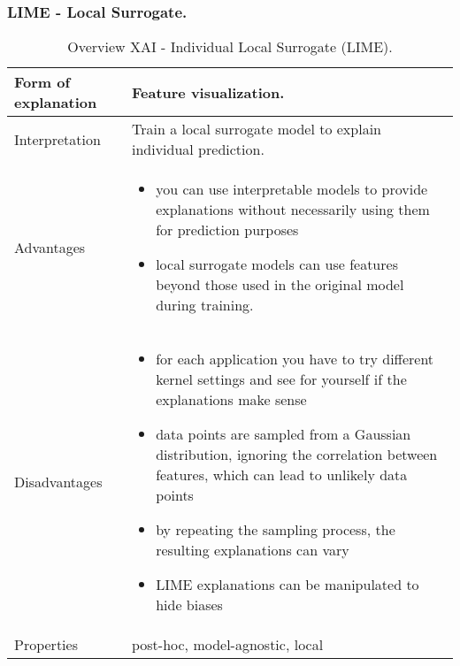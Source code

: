 \subsubsection{LIME - Local Surrogate.}
\begin{table}[H]
  \centering
  \begin{tabular}{|p{}|p{}|}
    \hline
    Form of \newline explanation & 
    Feature visualization. \\
    
    \hline
    Interpretation & 
    Train a local surrogate model to explain individual prediction.\\
    \hline
    Advantages &
    \begin{itemize}[nosep, left=0em]
        \item you can use interpretable models to provide explanations without necessarily using them for prediction purposes
        \item local surrogate models can use features beyond those used in the original model during training.
    \end{itemize} \\
    
    \hline
    Disadvantages &
    \begin{itemize}[nosep, left=0em]
        \item for each application you have to try different kernel settings and see for yourself if the explanations make sense
        \item data points are sampled from a Gaussian distribution, ignoring the correlation between features, which can lead to unlikely data points
        \item by repeating the sampling process, the resulting explanations can vary
        \item LIME explanations can be manipulated to hide biases\cite{slack2020fooling}
    \end{itemize} \\
    
    \hline
    Properties & 
    post-hoc, model-agnostic, local  \\
    
    \hline
  \end{tabular}
  \caption{Overview XAI - Individual Local Surrogate (LIME).}
  \label{tab:XAILIME}
\end{table}








